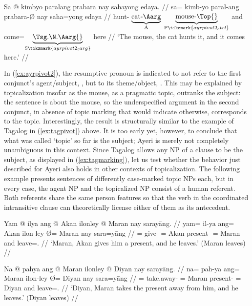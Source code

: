 \ex\label{ex:ayrpivot2}
\begingl[aboveglftskip=1em]
	\gla Sa @ kimbyo paralang prabara nay sahayong edaya. //
	\glb sa= kimb-yo paral-ang prabara-Ø nay saha=yong edaya  //
	\glc \PatT{} hunt-\TsgN{}
		$\underbrace{\text{cat-\Aarg}}_{\text{A}}$
		$\underbrace{\text{mouse-\Top{}}}_{\text{P}\tikzmark{ayrpivot2_ctrl}}$
		and
		come=$\underbrace{\text{\smash{\TsgN{}}.\Aarg{}}}_%
			{\text{S}\tikzmark{ayrpivot2_targ}}$
		here //
	\glft `The mouse, the cat hunts it, and it comes here.' //
\endgl

\xe

In (\ref{ex:ayrpivot2}), the resumptive pronoun is indicated to not refer to
the first conjunct's agent/subject, , but to its
theme/object, . This may be explained by topicalization
insofar as the mouse, as a pragmatic topic, outranks the subject: the sentence
is about the mouse, so the underspecified argument in the second conjunct, in
absence of topic marking that would indicate otherwise, corresponds to the
topic. Interestingly, the result is structurally similar to the example of
Tagalog in (\ref{ex:tagpivot}) above. It is too early yet, however, to conclude
that what was called `topic' so far is the subject; Ayeri is merely not
completely unambiguous in this context. Since Tagalog allows any NP of a clause
to be the subject, as displayed in (\ref{ex:tagmarking}), let us test whether
the behavior just described for Ayeri also holds in other contexts of
topicalization. The following example presents sentences of differently
case-marked topic NPs each, but in every case, the agent NP and the topicalized
NP consist of a human referent. Both referents share the same person features
so that the verb in the coordinated intransitive clause can theoretically
license either of them as its antecedent.

\pex\label{ex:ayrpivot3}
\a\label{ex:ayrpivot3_dat}\begingl
	\gla Yam @ ilya ang @ Akan ilonley {} @ Maran nay sarayāng. //
	\glb yam= il-ya ang= Akan ilon-ley Ø= Maran nay sara=yāng //
	\glc \DatT{}= give-\TsgM{} \Aarg{}= Akan present-\PargI{} \Top{}= Maran
		and leave=\TsgM{}.\Aarg{} //
	\glft `Maran, Akan gives him a present, and he leaves.' (Maran leaves) //
\endgl

\a\label{ex:ayrpivot3_gen}\begingl
	\gla Na @ pahya ang @ Maran ilonley {} @ Diyan nay sarayāng. //
	\glb na= pah-ya ang= Maran ilon-ley Ø= Diyan nay sara=yāng //
	\glc \GenT{}= take.away-\TsgM{} \Aarg{}= Maran present-\PargI{} \Top{}=
		Diyan and leave=\TsgM{}.\Aarg{} //
	\glft `Diyan, Maran takes the present away from him, and he leaves.' (Diyan
		leaves) //
\endgl

